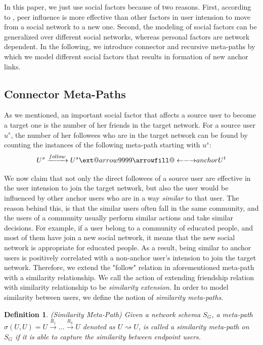 \documentclass[conference]{IEEEtran}
\makeatletter
\newtheorem{definition}{Definition}[section]
\newcommand\xleftrightarrow[2][]{%
  \ext@arrow 9999{\longleftrightarrowfill@}{#1}{#2}}
\newcommand\longleftrightarrowfill@{%
  \arrowfill@\leftarrow\relbar\rightarrow}
\makeatother
\begin{document}
In this paper, we just use social factors because of two reasons. First, according to \cite{xu2014retaining}, peer influence is more effective than other factors in user intension to move from a social network to a new one. Second, the modeling of social factors can be generalized over different social networks, whereas personal factors are network dependent. In the following, we introduce connector and recursive meta-paths by which we model different social factors that results in formation of new anchor links.

\subsection{Connector Meta-Paths}\label{sec:method:connector}

As we mentioned, an important social factor that affects a source user to become a target one is the number of her friends in the target network. For a source user $u^s$, the number of her followees who are in the target network can be found by counting the instances of the following meta-path starting with $u^s$:
\begin{equation*}\label{eq:neighborcount}
U^s\xrightarrow{follow}U^s\xleftrightarrow{anchor}U^t
\end{equation*}

We now claim that not only the direct followees of a source user are effective in the user intension to join the target network, but also the user would be influenced by other anchor users who are in a way \textit{similar} to that user. The reason behind this, is that the similar users often fall in the same community, and the users of a community usually perform similar actions and take similar decisions. For example, if a user belong to a community of educated people, and most of them have join a new social network, it means that the new social network is appropriate for educated people. As a result, being similar to anchor users is positively correlated with a non-anchor user's intension to join the target network. Therefore, we extend the "follow" relation in aforementioned meta-path with a similarity relationship. We call the action of extending friendship relation with similarity relationship to be \textit{similarity extension}. In order to model similarity between users, we define the notion of \textit{similarity meta-paths}.

\begin{definition}{(Similarity Meta-Path)}
Given a network schema $S_G$, a meta-path $\sigma(U,U) = U\xrightarrow{R_1}\dots\xrightarrow{R_k}U$ denoted as $U\rightsquigarrow U$, is called a similarity meta-path on $S_G$ if it is able to capture the similarity between endpoint users.
\end{definition}
\end{document}
